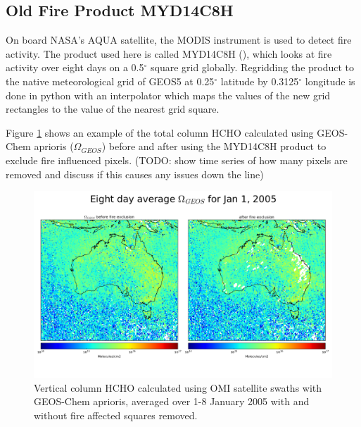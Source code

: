     
  \subsection{Old Fire Product MYD14C8H}
    
    On board NASA's AQUA satellite, the MODIS instrument is used to detect fire activity.
    The product used here is called MYD14C8H (\parencite{Giglio2006}), which looks at fire activity over eight days on a 0.5$^{\circ}$ square grid globally.
    Regridding the product to the native meteorological grid of GEOS5 at 0.25$^{\circ}$ latitude by 0.3125$^{\circ}$ longitude is done in python with an interpolator which maps the values of the new grid rectangles to the value of the nearest grid square.
    
    Figure \ref{ch_HCHO:fig:fireexclusionexample} shows an example of the total column HCHO calculated using GEOS-Chem aprioris ($\Omega_{GEOS}$) before and after using the MYD14C8H product to exclude fire influenced pixels.
    (TODO: show time series of how many pixels are removed and discuss if this causes any issues down the line)
    
    \begin{figure}[!htbp]\begin{center}
      \includegraphics[width=\textwidth]{Figures/HCHO/fire_exclusion_aus_8d.png}
      \caption{Vertical column HCHO calculated using OMI satellite swaths with GEOS-Chem aprioris, averaged over 1-8 January 2005 with and without fire affected squares removed.}
      \label{ch_HCHO:fig:fireexclusionexample}
    \end{center}\end{figure}
      
